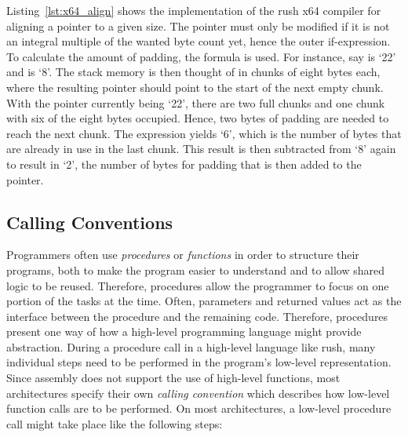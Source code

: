 Listing~\ref{lst:x64_align} shows the implementation of the rush x64 compiler for aligning a pointer to a given size.
The pointer must only be modified if it is not an integral multiple of the wanted byte count yet, hence the outer if-expression.
To calculate the amount of padding, the formula  is used.
For instance, say  is `22' and  is `8'.
The stack memory is then thought of in chunks of eight bytes each, where the resulting pointer should point to the start of the next empty chunk.
With the pointer currently being `22', there are two full chunks and one chunk with six of the eight bytes occupied.
Hence, two bytes of padding are needed to reach the next chunk.
The expression  yields `6', which is the number of bytes that are already in use in the last chunk.
This result is then subtracted from `8' again to result in `2', the number of bytes for padding that is then added to the pointer.





\subsection{Calling Conventions}

Programmers often use \emph{procedures} or \emph{functions} in order to structure their programs,
both to make the program easier to understand and to allow shared logic to be reused.
Therefore, procedures allow the programmer to focus on one portion of the tasks at the time.
Often, parameters and returned values act as the interface between the procedure and the remaining code.
Therefore, procedures present one way of how a high-level programming language might provide abstraction.
During a procedure call in a high-level language like rush, many individual steps need to be performed in the program's low-level representation.
Since assembly does not support the use of high-level functions, most architectures specify their own \emph{calling convention} which describes how low-level function calls are to be performed.
On most architectures, a low-level procedure call might take place like the following steps:

